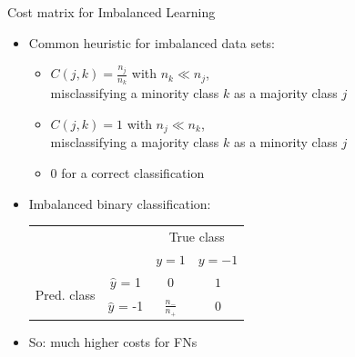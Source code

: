 \documentclass[11pt,compress,t,notes=noshow, xcolor=table]{beamer}
\begin{document}
\begin{frame}{Cost matrix for Imbalanced Learning}
		\begin{itemize}			
	 
			\item Common heuristic for imbalanced data sets: 
	
			\begin{itemize}
                \item $C(j,k) = \frac{n_j}{n_k}$ with $n_k  \ll n_j$,\\
                misclassifying a minority class $k$ as a majority class $j$
		
				\item $C(j,k) = 1$ with $n_j \ll n_k$,\\
    misclassifying a majority class $k$ as a minority class $j$
			
				\item 0 for a correct classification 
			
			\end{itemize}
\vspace{1cm}
    		\item Imbalanced binary classification: \\
            \begin{table}[]
                \centering
                \begin{tabular}{cc|cc}
                    & &\multicolumn{2}{c}{True class} \\
                    & & $y=1$ & $y=-1$  \\
                    \hline
                    \multirow{2}{*}{\parbox{0.5cm}{Pred. class}}& $\hat y$ = 1     & $0$                & $ 1 $\\
                    & $\hat y$ = -1 & $ \frac{n_-}{n_+} $              &  $0$   \\
                \end{tabular}
            \end{table}
    		

            \item So: much higher costs for FNs
        \end{itemize}
		
\end{frame}
\end{document}
